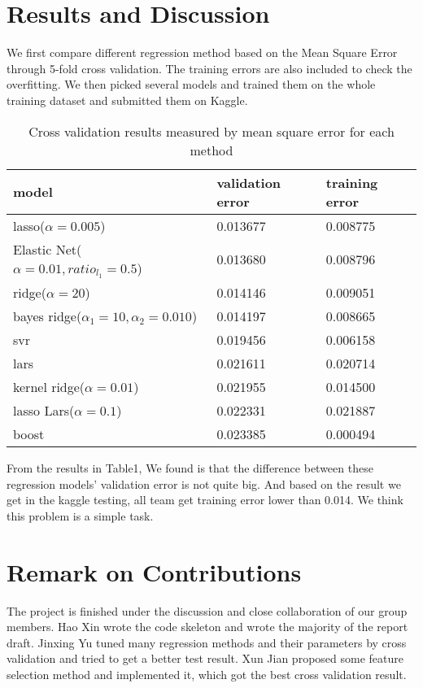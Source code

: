 \documentclass{article}
\begin{document}
\section{Results and Discussion}
We first compare different regression method based on the Mean Square Error through 5-fold cross validation. The training errors are also included to check the overfitting. We then picked several models and trained them on the whole training dataset and submitted them on Kaggle.
\begin{table}[htbp]
\centering
\begin{tabular}{|l|l|l|}
\hline
model & validation error & training error \\
\hline
lasso($\alpha=0.005$)         &  0.013677 & 0.008775 \\
\hline
Elastic Net($\alpha=0.01,ratio_{l_1}=0.5$)   &  0.013680 & 0.008796 \\
\hline
ridge($\alpha=20$)         &  0.014146 & 0.009051 \\
\hline
bayes ridge($\alpha_1=10,\alpha_2=0.010$)  &  0.014197 & 0.008665 \\
\hline
svr        &  0.019456 & 0.006158 \\
\hline
lars       & 0.021611 & 0.020714 \\
\hline
kernel ridge($\alpha=0.01$)  &  0.021955 & 0.014500 \\
\hline
lasso Lars($\alpha=0.1$)    &  0.022331 & 0.021887 \\
\hline
boost         &  0.023385 & 0.000494 \\
\hline
\end{tabular}
\caption{Cross validation results measured by mean square error for each method}
\end{table}
From the results in Table1, 
We found is that the difference between these regression models' validation error is not quite big. And based on the result we get in the kaggle testing, all team get training error lower than 0.014. We think this problem is a simple task.

\section{Remark on Contributions}
The project is finished under the discussion and close collaboration of our group members. Hao Xin wrote the code skeleton and wrote the majority of the report draft. Jinxing Yu tuned many regression methods and their parameters by cross validation and tried to get a better test result. Xun Jian proposed some feature selection method and implemented it, which got the best cross validation result.
\end{document}
